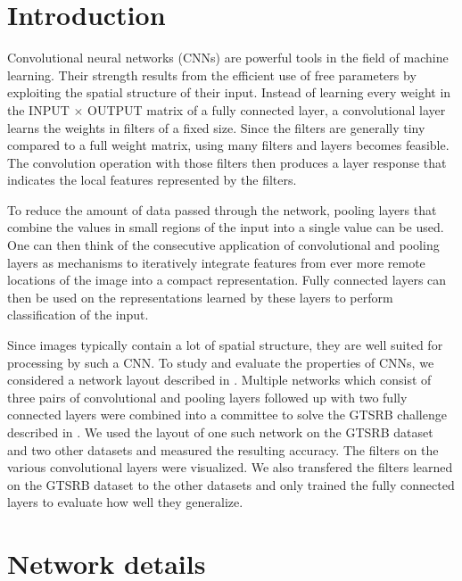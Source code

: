 \documentclass[11pt, a4paper]{article}
\begin{document}
\newpage
\section{Introduction}
Convolutional neural networks (CNNs) are powerful tools in the field of machine learning. Their strength results from the efficient use of free parameters by exploiting the spatial structure of their input. Instead of learning every weight in the INPUT $\times$ OUTPUT matrix of a fully connected layer, a convolutional layer learns the weights in filters of a fixed size. Since the filters are generally tiny compared to a full weight matrix, using many filters and layers becomes feasible. The convolution operation with those filters then produces a layer response that indicates the local features represented by the filters.

To reduce the amount of data passed through the network, pooling layers that combine the values in small regions of the input into a single value can be used. One can then think of the consecutive application of convolutional and pooling layers as mechanisms to iteratively integrate features from ever more remote locations of the image into a compact representation. Fully connected layers can then be used on the representations learned by these layers to perform classification of the input.

Since images typically contain a lot of spatial structure, they are well suited for processing by such a CNN. To study and evaluate the properties of CNNs, we considered a network layout described in \cite{multi-column-neural-network-gtsrb}. Multiple networks which consist of three pairs of convolutional and pooling layers followed up with two fully connected layers were combined into a committee to solve the GTSRB challenge described in \cite{gtsrb}. We used the layout of one such network on the GTSRB dataset and two other datasets and measured the resulting accuracy. The filters on the various convolutional layers were visualized. We also transfered the filters learned on the GTSRB dataset to the other datasets and only trained the fully connected layers to evaluate how well they generalize.

\section{Network details}
\end{document}
